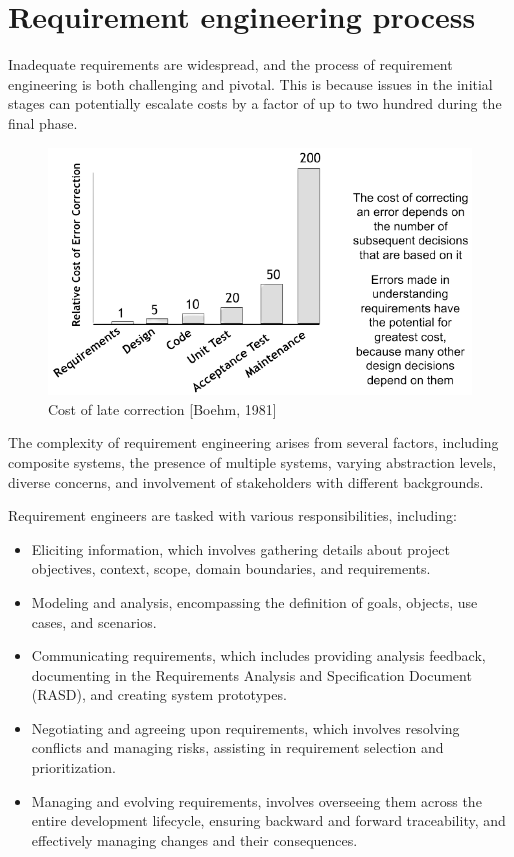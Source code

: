 \documentclass[12pt, a4paper]{report}
\begin{document}
    \section{Requirement engineering process}
    Inadequate requirements are widespread, and the process of requirement engineering is both challenging and pivotal. 
    This is because issues in the initial stages can potentially escalate costs by a factor of up to two hundred during the final phase.
    \begin{figure}[H]
        \centering
        \includegraphics[width=0.5\linewidth]{images/requirements.png}
        \caption{Cost of late correction [Boehm, 1981]}
    \end{figure}
    The complexity of requirement engineering arises from several factors, including composite systems, the presence of multiple systems, varying abstraction levels, diverse concerns, and involvement of stakeholders with different backgrounds.
    
    Requirement engineers are tasked with various responsibilities, including:
    \begin{itemize}
        \item Eliciting information, which involves gathering details about project objectives, context, scope, domain boundaries, and requirements.
        \item Modeling and analysis, encompassing the definition of goals, objects, use cases, and scenarios.
        \item Communicating requirements, which includes providing analysis feedback, documenting in the Requirements Analysis and Specification Document (RASD), and creating system prototypes.
        \item Negotiating and agreeing upon requirements, which involves resolving conflicts and managing risks, assisting in requirement selection and prioritization.
        \item Managing and evolving requirements, involves overseeing them across the entire development lifecycle, ensuring backward and forward traceability, and effectively managing changes and their consequences.
    \end{itemize}
\end{document}
